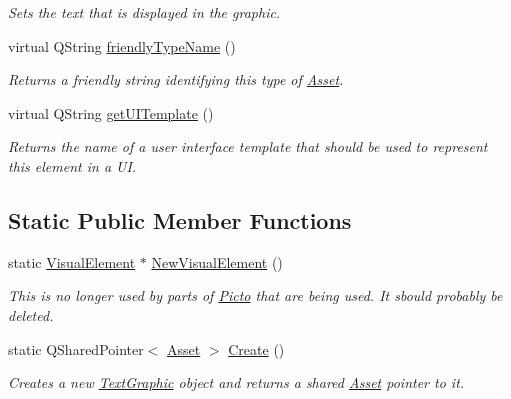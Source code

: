 \begin{DoxyCompactItemize}
\begin{DoxyCompactList}\small\item\em Sets the text that is displayed in the graphic. \end{DoxyCompactList}\item 
virtual Q\-String \hyperlink{class_picto_1_1_text_graphic_adf12e486b4a6a42adbc3fa85d7d27f8f}{friendly\-Type\-Name} ()
\begin{DoxyCompactList}\small\item\em Returns a friendly string identifying this type of \hyperlink{class_picto_1_1_asset}{Asset}. \end{DoxyCompactList}\item 
\hypertarget{class_picto_1_1_text_graphic_ab18a87d4a19d9c65b7d4a62f35048fa6}{virtual Q\-String \hyperlink{class_picto_1_1_text_graphic_ab18a87d4a19d9c65b7d4a62f35048fa6}{get\-U\-I\-Template} ()}\label{class_picto_1_1_text_graphic_ab18a87d4a19d9c65b7d4a62f35048fa6}

\begin{DoxyCompactList}\small\item\em Returns the name of a user interface template that should be used to represent this element in a U\-I. \end{DoxyCompactList}\end{DoxyCompactItemize}
\subsection*{Static Public Member Functions}
\begin{DoxyCompactItemize}
\item 
\hypertarget{class_picto_1_1_text_graphic_a7558f805b2aed1498d4d59ca386b4f5a}{static \hyperlink{struct_picto_1_1_visual_element}{Visual\-Element} $\ast$ \hyperlink{class_picto_1_1_text_graphic_a7558f805b2aed1498d4d59ca386b4f5a}{New\-Visual\-Element} ()}\label{class_picto_1_1_text_graphic_a7558f805b2aed1498d4d59ca386b4f5a}

\begin{DoxyCompactList}\small\item\em This is no longer used by parts of \hyperlink{namespace_picto}{Picto} that are being used. It sbould probably be deleted. \end{DoxyCompactList}\item 
\hypertarget{class_picto_1_1_text_graphic_af3c313a0f7d927a53da25def1d828c89}{static Q\-Shared\-Pointer$<$ \hyperlink{class_picto_1_1_asset}{Asset} $>$ \hyperlink{class_picto_1_1_text_graphic_af3c313a0f7d927a53da25def1d828c89}{Create} ()}\label{class_picto_1_1_text_graphic_af3c313a0f7d927a53da25def1d828c89}

\begin{DoxyCompactList}\small\item\em Creates a new \hyperlink{class_picto_1_1_text_graphic}{Text\-Graphic} object and returns a shared \hyperlink{class_picto_1_1_asset}{Asset} pointer to it. \end{DoxyCompactList}\end{DoxyCompactItemize}

